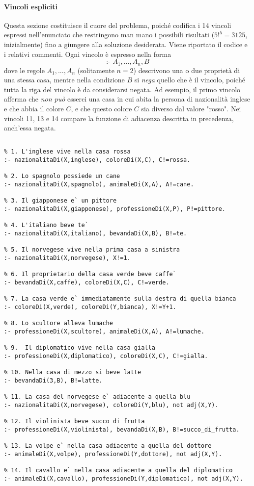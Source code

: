 \paragraph{Vincoli espliciti}
Questa sezione costituisce il cuore del problema, poiché codifica i 14 vincoli espressi nell'enunciato che restringono man mano i possibili risultati ($5!^5 = 3125$, inizialmente) fino a giungere alla soluzione desiderata. Viene riportato il codice e i relativi commenti. Ogni vincolo è espresso nella forma $$\text{:- } A_1, ..., A_n, B$$ dove le regole $A_1, ..., A_n$ (solitamente $n = 2$) descrivono una o due proprietà di una stessa casa, mentre nella condizione $B$ si \emph{nega} quello che è il vincolo, poiché tutta la riga del vincolo è da considerarsi negata. Ad esempio, il primo vincolo afferma che \emph{non può} esserci una casa in cui abita la persona di nazionalità inglese e che abbia il colore $C$, e che questo colore $C$ sia diverso dal valore "rosso". Nei vincoli 11, 13 e 14 compare la funzione di adiacenza descritta in precedenza, anch'essa negata.
\clearpage{}
\begin{lstlisting}[frame=tb]
%% Vincoli espliciti

% 1. L'inglese vive nella casa rossa
:- nazionalitaDi(X,inglese), coloreDi(X,C), C!=rossa.

% 2. Lo spagnolo possiede un cane
:- nazionalitaDi(X,spagnolo), animaleDi(X,A), A!=cane.

% 3. Il giapponese e` un pittore
:- nazionalitaDi(X,giapponese), professioneDi(X,P), P!=pittore.

% 4. L'italiano beve te`
:- nazionalitaDi(X,italiano), bevandaDi(X,B), B!=te.

% 5. Il norvegese vive nella prima casa a sinistra
:- nazionalitaDi(X,norvegese), X!=1.

% 6. Il proprietario della casa verde beve caffe`
:- bevandaDi(X,caffe), coloreDi(X,C), C!=verde.

% 7. La casa verde e` immediatamente sulla destra di quella bianca
:- coloreDi(X,verde), coloreDi(Y,bianca), X!=Y+1.

% 8. Lo scultore alleva lumache
:- professioneDi(X,scultore), animaleDi(X,A), A!=lumache.

% 9.  Il diplomatico vive nella casa gialla
:- professioneDi(X,diplomatico), coloreDi(X,C), C!=gialla.

% 10. Nella casa di mezzo si beve latte
:- bevandaDi(3,B), B!=latte.

% 11. La casa del norvegese e` adiacente a quella blu
:- nazionalitaDi(X,norvegese), coloreDi(Y,blu), not adj(X,Y).

% 12. Il violinista beve succo di frutta
:- professioneDi(X,violinista), bevandaDi(X,B), B!=succo_di_frutta.

% 13. La volpe e` nella casa adiacente a quella del dottore
:- animaleDi(X,volpe), professioneDi(Y,dottore), not adj(X,Y).

% 14. Il cavallo e` nella casa adiacente a quella del diplomatico
:- animaleDi(X,cavallo), professioneDi(Y,diplomatico), not adj(X,Y).
\end{lstlisting}
